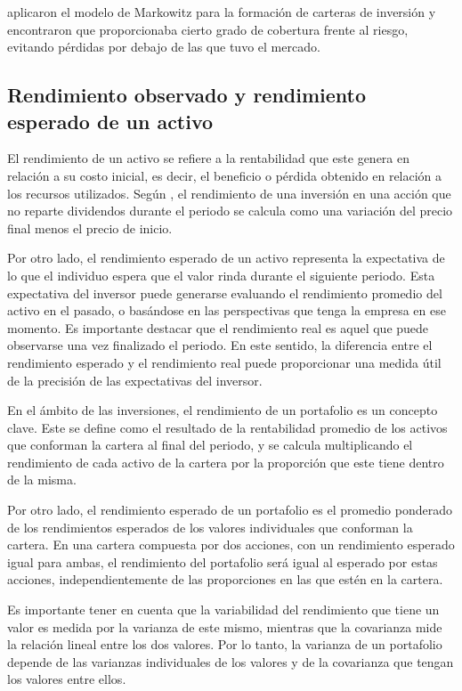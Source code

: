 \documentclass[a4paper,fleqn]{cas-sc}
\begin{document}
\cite{Galvez} aplicaron el modelo de Markowitz para la formación de carteras de inversión y encontraron que proporcionaba cierto grado de cobertura frente al riesgo, evitando pérdidas por debajo de las que tuvo el mercado.

\subsection{Rendimiento observado y rendimiento esperado de un activo}

El rendimiento de un activo se refiere a la rentabilidad que este genera en relación a su costo inicial, es decir, el beneficio o pérdida obtenido en relación a los recursos utilizados. Según \cite{Gonzalez}, el rendimiento de una inversión en una acción que no reparte dividendos durante el periodo se calcula como una variación del precio final menos el precio de inicio.

Por otro lado, el rendimiento esperado de un activo representa la expectativa de lo que el individuo espera que el valor rinda durante el siguiente periodo. Esta expectativa del inversor puede generarse evaluando el rendimiento promedio del activo en el pasado, o basándose en las perspectivas que tenga la empresa en ese momento. Es importante destacar que el rendimiento real es aquel que puede observarse una vez finalizado el periodo. En este sentido, la diferencia entre el rendimiento esperado y el rendimiento real puede proporcionar una medida útil de la precisión de las expectativas del inversor.

En el ámbito de las inversiones, el rendimiento de un portafolio es un concepto clave. Este se define como el resultado de la rentabilidad promedio de los activos que conforman la cartera al final del periodo, y se calcula multiplicando el rendimiento de cada activo de la cartera por la proporción que este tiene dentro de la misma.

Por otro lado, el rendimiento esperado de un portafolio es el promedio ponderado de los rendimientos esperados de los valores individuales que conforman la cartera. En una cartera compuesta por dos acciones, con un rendimiento esperado igual para ambas, el rendimiento del portafolio será igual al esperado por estas acciones, independientemente de las proporciones en las que estén en la cartera.

Es importante tener en cuenta que la variabilidad del rendimiento que tiene un valor es medida por la varianza de este mismo, mientras que la covarianza mide la relación lineal entre los dos valores. Por lo tanto, la varianza de un portafolio depende de las varianzas individuales de los valores y de la covarianza que tengan los valores entre ellos.
\end{document}
